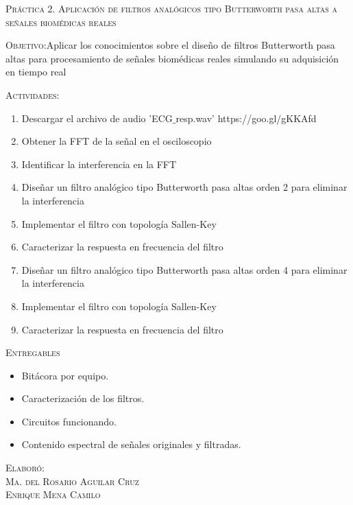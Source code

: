 \documentclass[10pt,letterpaper,spanish,twoside]{report}
\begin{document}
\docdate

\begin{center}
 \textsc{\asignatura}\vspace{.2em}
\end{center}

\textsc{Práctica 2. Aplicación de filtros analógicos tipo Butterworth pasa altas a señales biomédicas reales}

\textsc{Objetivo:}Aplicar los conocimientos sobre el diseño de filtros Butterworth pasa altas para procesamiento de señales biomédicas reales simulando su adquisición en tiempo real

\textsc{Actividades:}
\begin{enumerate}
  \item Descargar el archivo de audio 'ECG$\_$resp.wav' https://goo.gl/gKKAfd
  \item Obtener la FFT de la señal en el osciloscopio
  \item Identificar la interferencia en la FFT
  \item Diseñar un filtro analógico tipo Butterworth pasa altas orden 2 para eliminar la interferencia
  \item Implementar el filtro con topología Sallen-Key
  \item Caracterizar la respuesta en frecuencia del filtro
  \item Diseñar un filtro analógico tipo Butterworth pasa altas orden 4 para eliminar la interferencia
  \item Implementar el filtro con topología Sallen-Key
  \item Caracterizar la respuesta en frecuencia del filtro
\end{enumerate}

\textsc{Entregables}
\begin{itemize}
  \item Bitácora por equipo.
  \item Caracterización de los filtros.
  \item Circuitos funcionando.
  \item Contenido espectral de señales originales y filtradas.
\end{itemize}


\vfill
\begin{flushright}
\textsc{Elaboró:\\
Ma. del Rosario Aguilar Cruz\\
Enrique Mena Camilo}
\end{flushright}
\end{document}
